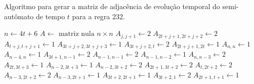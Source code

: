 \documentclass[12pt,a4paper]{article}
\begin{document}
\begin{algorithm}[H]
\caption{Algoritmo para gerar a matriz de adjacência de evolução temporal do
semi-autômato de tempo $t$ para a regra 232.}
\label{alg:r232}
\begin{algorithmic}
\STATE $n \leftarrow 4t+6$
\STATE $A \leftarrow \mbox{ matriz nula } n \times n$
        \STATE $A_{j,j+1} \leftarrow 2$
        \STATE $A_{2t+j+1,2t+j+2} \leftarrow 2$
        \STATE $A_{t+j,t+j+1} \leftarrow 1$
        \STATE $A_{3t+j+2,3t+j+3} \leftarrow 1$
    \ENDFOR
\ENDIF
{}
    \STATE $A_{3t+j+2,t} \leftarrow 2$
    \STATE $A_{2t+j+1,2t} \leftarrow 1$
\ENDFOR
\STATE $A_{n,n} \leftarrow 1$
\STATE $A_{n-4,n} \leftarrow 1$
\STATE $A_{3t+1,n-1} \leftarrow 2$
\STATE $A_{n-1,n-1} \leftarrow 2$
\STATE $A_{n-1,n-2} \leftarrow 1$
\STATE $A_{n,n-3} \leftarrow 2$
\STATE $A_{2t,3t+3} \leftarrow 1$
\STATE $A_{n-2,3t+3} \leftarrow 1$
\STATE $A_{n-2,3t+2} \leftarrow 2$
\STATE $A_{2t+1,3t+2} \leftarrow 2$
\STATE $A_{t,2t+2} \leftarrow 2$
\STATE $A_{n-3,2t+2} \leftarrow 2$
\STATE $A_{n-3,2t+1} \leftarrow 1$
\STATE $A_{3t+2,2t+1} \leftarrow 1$
\STATE $A_{3t+2,1} \leftarrow 2$
\STATE $A_{2t+1,t+1} \leftarrow 1$
\end{algorithmic}
\end{algorithm}

\newpage

\def\refname{Referências Bibliográficas}


\end{document}
